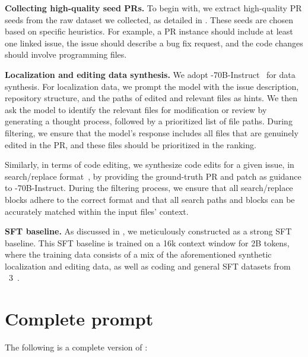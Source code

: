 \textbf{Collecting high-quality seed PRs.}
To begin with, we extract high-quality PR seeds from the raw dataset we collected, as detailed in .
These seeds are chosen based on specific heuristics. For example, a PR instance should include at least one linked issue, the issue should describe a bug fix request, and the code changes should involve programming files.

\textbf{Localization and editing data synthesis.}
We adopt -70B-Instruct~\cite{llama31} for data synthesis.
For localization data, we prompt the model with the issue description, repository structure, and the paths of edited and relevant files as hints. We then ask the model to identify the relevant files for modification or review by generating a thought process, followed by a prioritized list of file paths.
During filtering, we ensure that the model's response includes all files that are genuinely edited in the PR, and these files should be prioritized in the ranking.

Similarly, in terms of code editing, we synthesize code edits for a given issue, in search/replace format~\cite{agentless}, by providing the ground-truth PR and patch as guidance to -70B-Instruct.
During the filtering process, we ensure that all search/replace blocks adhere to the correct format and that all search paths and blocks can be accurately matched within the input files' context.

\textbf{SFT baseline.}
As discussed in , we meticulously constructed \oursft[70] as a strong SFT baseline.
This SFT baseline is trained on a 16k context window for 2B tokens,
where the training data consists of a mix of the aforementioned synthetic localization and editing data, as well as coding and general SFT datasets from \llama~3~\cite{llama31}. 












\section{Complete prompt}
\label{sec:apd:fullprompt}

The following is a complete version of :


